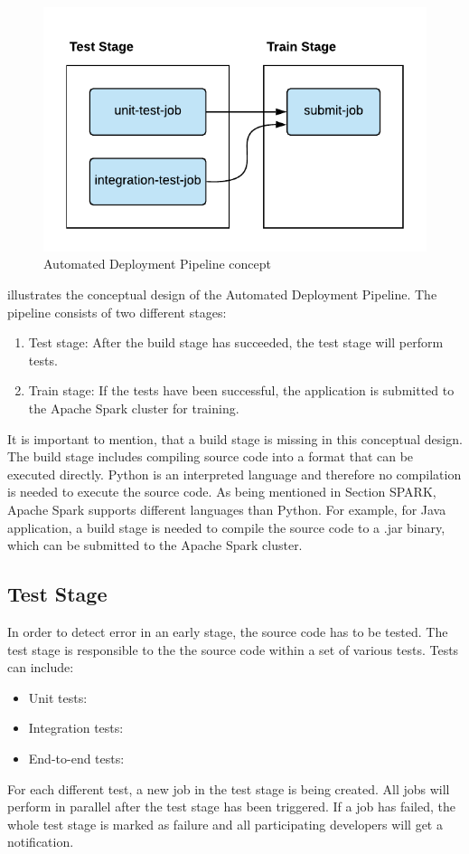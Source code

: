 \begin{figure}[h]
\centering
\includegraphics[scale=1]{images/05_conceptual_design/automated_deployment_pipeline/ci_cd_concept}
\caption{Automated Deployment Pipeline concept}
\label{fig:05_deployment_concept}
\end{figure}
 illustrates the conceptual design of the Automated Deployment Pipeline.
The pipeline consists of two different stages:
\begin{enumerate}
\item Test stage: After the build stage has succeeded, the test stage will perform tests.
\item Train stage: If the tests have been successful, the application is submitted to the Apache Spark cluster for training.
\end{enumerate}
It is important to mention, that a build stage is missing in this conceptual design. The build stage includes compiling source code into a format that can be executed directly.
Python is an interpreted language and therefore no compilation is needed to execute the source code. 
As being mentioned in Section SPARK, Apache Spark supports different languages than Python.  For example, for Java application, a build stage is needed to compile the source code to a .jar binary, which can be submitted to the Apache Spark cluster.


\subsection{Test Stage}
In order to detect error in an early stage, the source code has to be tested.
The test stage is responsible to the the source code within a set of various tests. Tests can include:
\begin{itemize}
\item Unit tests:
\item Integration tests:
\item End-to-end tests:
\end{itemize}
For each different test, a new job in the test stage is being created. All jobs will perform in parallel after the test stage has been triggered.
If a job has failed, the whole test stage is marked as failure and all participating developers will get a notification.


